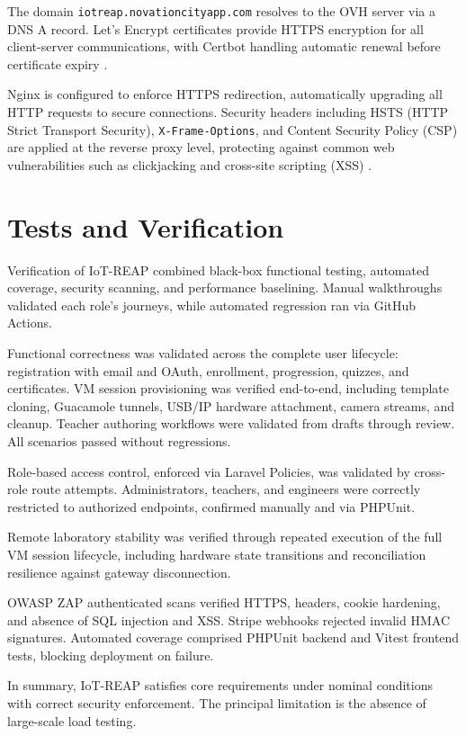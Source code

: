 The domain \texttt{iotreap.novationcityapp.com} resolves to the OVH server via
a DNS A record. Let's Encrypt certificates provide HTTPS encryption for all
client-server communications, with Certbot handling automatic renewal before
certificate expiry {\footnotesize\cite{letsencrypt-docs,certbot-docs}}.

Nginx is configured to enforce HTTPS redirection, automatically upgrading all
HTTP requests to secure connections. Security headers including HSTS (HTTP
Strict Transport Security), \texttt{X-Frame-Options}, and Content Security
Policy (CSP) are applied at the reverse proxy level, protecting against common
web vulnerabilities such as clickjacking and cross-site scripting (XSS)
  {\footnotesize\cite{nginx-docs,mdn-hsts,mdn-csp}}.
\section{Tests and Verification}
\label{sec:tests}

Verification of IoT-REAP combined black-box functional testing, automated coverage, security scanning, and performance baselining. Manual walkthroughs validated each role's journeys, while automated regression ran via GitHub Actions.

Functional correctness was validated across the complete user lifecycle: registration with email and OAuth, enrollment, progression, quizzes, and certificates. VM session provisioning was verified end-to-end, including template cloning, Guacamole tunnels, USB/IP hardware attachment, camera streams, and cleanup. Teacher authoring workflows were validated from drafts through review. All scenarios passed without regressions.

Role-based access control, enforced via Laravel Policies, was validated by cross-role route attempts. Administrators, teachers, and engineers were correctly restricted to authorized endpoints, confirmed manually and via PHPUnit.

Remote laboratory stability was verified through repeated execution of the full VM session lifecycle, including hardware state transitions and reconciliation resilience against gateway disconnection.

OWASP ZAP authenticated scans verified HTTPS, headers, cookie hardening, and absence of SQL injection and XSS. Stripe webhooks rejected invalid HMAC signatures.
Automated coverage comprised PHPUnit backend and Vitest frontend tests, blocking deployment on failure.

In summary, IoT-REAP satisfies core requirements under nominal conditions with correct security enforcement. The principal limitation is the absence of large-scale load testing.

